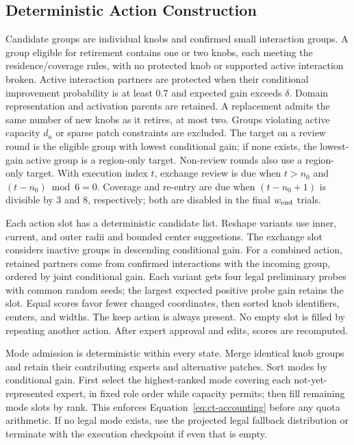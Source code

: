 \subsection{Deterministic Action Construction}

Candidate groups are individual knobs and confirmed small interaction
groups. A group eligible for retirement contains one or two knobs, each meeting
the residence/coverage rules, with no protected knob or supported active
interaction broken. Active interaction partners are protected when their
conditional improvement probability is at least $0.7$ and expected gain
exceeds $\delta$. Domain representation and activation parents are retained.
A replacement admits the same number of new knobs as it retires, at most
two. Groups violating active capacity $d_a$ or sparse patch constraints are
excluded. The target on a review round is the eligible group with lowest
conditional gain; if none exists, the lowest-gain active group is a
region-only target. Non-review rounds also use a region-only target. With execution index
$t$, exchange review is due when $t>n_0$ and $(t-n_0)\bmod6=0$.
Coverage and re-entry are due when $(t-n_0+1)$ is divisible by 3 and 8,
respectively; both are disabled in the final $w_{\rm end}$ trials.

Each action slot has a deterministic candidate list. Reshape variants use
inner, current, and outer radii and bounded center suggestions. The exchange
slot considers inactive groups in descending conditional gain. For a
combined action, retained partners come from confirmed interactions with
the incoming group, ordered by joint conditional gain. Each variant gets
four legal preliminary probes with common random seeds; the largest
expected positive probe gain retains the slot. Equal scores favor fewer
changed coordinates, then sorted knob identifiers, centers, and widths.
The keep action is always present. No empty slot is filled by repeating
another action. After expert approval and edits, scores are recomputed.

Mode admission is deterministic within every state. Merge identical knob
groups and retain their contributing experts and alternative patches.
Sort modes by conditional gain. First select the highest-ranked mode
covering each not-yet-represented expert, in fixed role order while
capacity permits; then fill remaining mode slots by rank. This enforces
Equation~\ref{eq:ct-accounting} before any quota arithmetic. If no legal
mode exists, use the projected legal fallback distribution or terminate
with the execution checkpoint if even that is empty.

